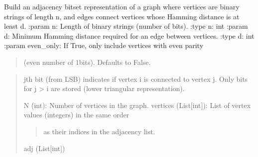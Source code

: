 \documentclass[letterpaper,10pt,english]{sphinxmanual}
\begin{document}
\begin{fulllineitems}
\label{\detokenize{index:hammindist.functions.build_adjacency_bitsets}}
\pysigstartsignatures
\pysiglinewithargsret
{}
{\sphinxparamcomma {}\sphinxparamcomma {}}
{}
\pysigstopsignatures
\sphinxAtStartPar
Build an adjacency bitset representation of a graph where vertices are binary strings
of length n, and edges connect vertices whose Hamming distance is at least d.
:param n: Length of binary strings (number of bits).
:type n: int
:param d: Minimum Hamming distance required for an edge between vertices.
:type d: int
:param even\_only: If True, only include vertices with even parity
\begin{quote}

\sphinxAtStartPar
(even number of 1\sphinxhyphen{}bits). Defaults to False.
\end{quote}
\begin{quote}\begin{description}
\sphinxAtStartPar
\begin{description}
\sphinxAtStartPar
j\sphinxhyphen{}th bit (from LSB) indicates if vertex i is connected to vertex j.
Only bits for j \textgreater{} i are stored (lower triangular representation).

\end{description}

\sphinxAtStartPar
N (int): Number of vertices in the graph.
vertices (List{[}int{]}): List of vertex values (integers) in the same order
\begin{quote}

\sphinxAtStartPar
as their indices in the adjacency list.
\end{quote}


\sphinxAtStartPar
adj (List{[}int{]})

\end{description}\end{quote}

\end{fulllineitems}
\end{document}

